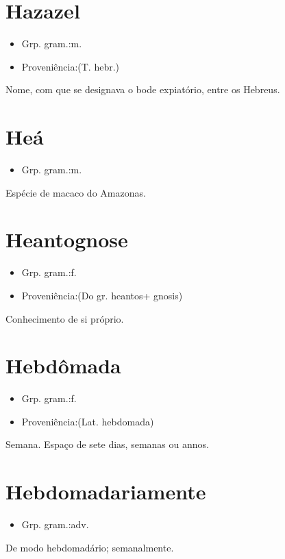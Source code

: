 \documentclass{article}
\begin{document}
\section{Hazazel}
\begin{itemize}
\item {Grp. gram.:m.}
\end{itemize}
\begin{itemize}
\item {Proveniência:(T. hebr.)}
\end{itemize}
Nome, com que se designava o bode expiatório, entre os Hebreus.
\section{Heá}
\begin{itemize}
\item {Grp. gram.:m.}
\end{itemize}
Espécie de macaco do Amazonas.
\section{Heantognose}
\begin{itemize}
\item {Grp. gram.:f.}
\end{itemize}
\begin{itemize}
\item {Proveniência:(Do gr. \textunderscore heantos\textunderscore  + \textunderscore gnosis\textunderscore )}
\end{itemize}
Conhecimento de si próprio.
\section{Hebdômada}
\begin{itemize}
\item {Grp. gram.:f.}
\end{itemize}
\begin{itemize}
\item {Proveniência:(Lat. \textunderscore hebdomada\textunderscore )}
\end{itemize}
Semana.
Espaço de sete dias, semanas ou annos.
\section{Hebdomadariamente}
\begin{itemize}
\item {Grp. gram.:adv.}
\end{itemize}
De modo hebdomadário; semanalmente.
\end{document}

